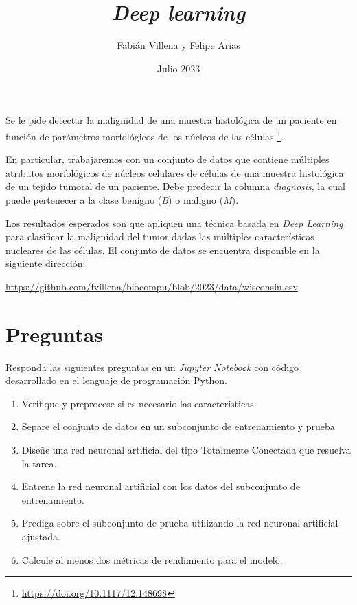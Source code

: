 \documentclass{article}
\title{\textit{Deep learning}}
\author{Fabián Villena y Felipe Arias}
\date{Julio 2023}
\begin{document}
\maketitle

Se le pide detectar la malignidad de una muestra histológica de un paciente en función de parámetros morfológicos de los núcleos de las células \footnote{\url{https://doi.org/10.1117/12.148698}}.

En particular, trabajaremos con un conjunto de datos que contiene múltiples atributos morfológicos de núcleos celulares de células de una muestra histológica de un tejido tumoral de un paciente. Debe predecir la columna \textit{diagnosis}, la cual puede pertenecer a la clase benigno (\textit{B}) o maligno (\textit{M}).

Los resultados esperados son que apliquen una técnica basada en \textit{Deep Learning} para clasificar la malignidad del tumor dadas las múltiples características nucleares de las células.  El conjunto de datos se encuentra disponible en la siguiente dirección:

\begin{center}
    \url{https://github.com/fvillena/biocompu/blob/2023/data/wisconsin.csv}
\end{center}

\section*{Preguntas}

Responda las siguientes preguntas en un \textit{Jupyter Notebook} con código desarrollado en el lenguaje de programación Python.

\begin{enumerate}
	\item Verifique y preprocese si es necesario las características.
    \item Separe el conjunto de datos en un subconjunto de entrenamiento y prueba
    \item Diseñe una red neuronal artificial del tipo Totalmente Conectada que resuelva la tarea.
    \item Entrene la red neuronal artificial con los datos del subconjunto de entrenamiento.
    \item Prediga sobre el subconjunto de prueba utilizando la red neuronal artificial ajustada.
    \item Calcule al menos dos métricas de rendimiento para el modelo.
\end{enumerate}
\end{document}
